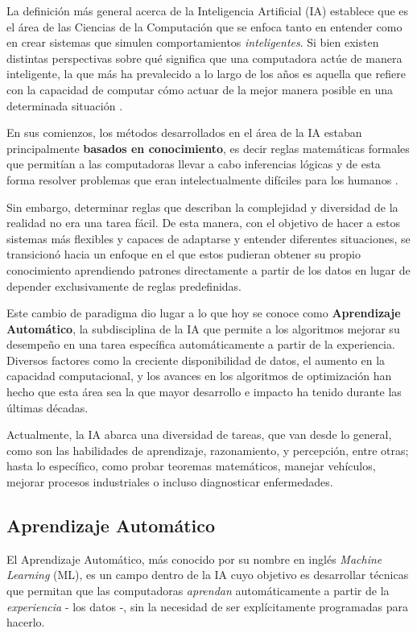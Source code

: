 \documentclass[../../main.tex]{subfiles}
\begin{document}
La definición más general acerca de la Inteligencia Artificial (IA) establece que es el
área de las Ciencias de la Computación que se enfoca tanto en entender como en crear
sistemas que simulen comportamientos \textit{inteligentes}. Si bien existen distintas
perspectivas sobre qué significa que una computadora actúe de manera inteligente, la que
más ha prevalecido a lo largo de los años es aquella que refiere con la capacidad de
computar cómo actuar de la mejor manera posible en una determinada situación
\cite{ai-a-modern-approach}.

En sus comienzos, los métodos desarrollados en el área de la IA estaban principalmente
\textbf{basados en conocimiento}, es decir reglas matemáticas formales que permitían a las
computadoras llevar a cabo inferencias lógicas y de esta forma resolver problemas que eran
intelectualmente difíciles para los humanos \cite{deep-learning}.

Sin embargo, determinar reglas que describan la complejidad y diversidad de la realidad no
era una tarea fácil. De esta manera, con el objetivo de hacer a estos sistemas más
flexibles y capaces de adaptarse y entender diferentes situaciones, se transicionó hacia
un enfoque en el que estos pudieran obtener su propio conocimiento aprendiendo patrones
directamente a partir de los datos en lugar de depender exclusivamente de reglas
predefinidas.

Este cambio de paradigma dio lugar a lo que hoy se conoce como \textbf{Aprendizaje
Automático}, la subdisciplina de la IA que permite a los algoritmos mejorar su desempeño
en una tarea específica automáticamente a partir de la experiencia. Diversos factores como
la creciente disponibilidad de datos, el aumento en la capacidad computacional, y los
avances en los algoritmos de optimización \cite{deep-learning} han hecho que esta área sea
la que mayor desarrollo e impacto ha tenido durante las últimas décadas.

Actualmente, la IA abarca una diversidad de tareas, que van desde lo general, como son las
habilidades de aprendizaje, razonamiento, y percepción, entre otras; hasta lo específico,
como probar teoremas matemáticos, manejar vehículos, mejorar procesos industriales o
incluso diagnosticar enfermedades.

\subsection{Aprendizaje Automático}
El Aprendizaje Automático, más conocido por su nombre en inglés \textit{Machine Learning}
(ML), es un campo dentro de la IA cuyo objetivo es desarrollar técnicas que permitan que
las computadoras \textit{aprendan} automáticamente a partir de la \textit{experiencia} -
los datos -, sin la necesidad de ser explícitamente programadas para hacerlo.
\end{document}
